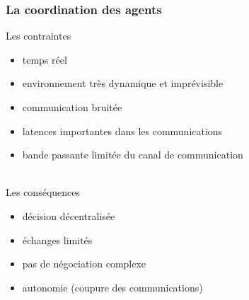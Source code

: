 \documentclass{beamer}
\begin{document}
\begin{frame}
\frametitle{La coordination des agents}
Les contraintes
\begin{itemize}
	\item temps réel
	\item environnement très dynamique et imprévisible
	\item communication bruitée
	\item latences importantes dans les communications
	\item bande passante limitée du canal de communication
\end{itemize}
~\\
Les conséquences
\begin{itemize}
	\item décision décentralisée
	\item échanges limités
	\item pas de négociation complexe
	\item autonomie (coupure des communications)
\end{itemize}
\end{frame}
\end{document}
